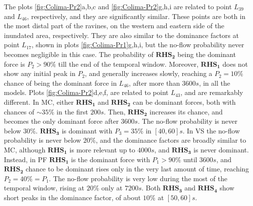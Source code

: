 \documentclass{article}
\begin{document}
The plots \ref{fig:Colima-Pr2}a,b,c and \ref{fig:Colima-Pr2}g,h,i are related to point $L_{39}$ and $L_{46}$, respectively, and they are significantly similar. These points are both in the most distal part of the ravines, on the western and eastern side of the inundated area, respectively. They are also similar to the dominance factors at point $L_{17}$, shown in plots \ref{fig:Colima-Pr1}g,h,i, but the no-flow probability never becomes negligible in this case. The probability of $\boldsymbol{RHS_2}$ being the dominant force is $P_2>90\%$ till the end of the temporal window. Moreover, $\boldsymbol{RHS_1}$ does not show any initial peak in $P_2$, and generally increases slowly, reaching a $P_2=10\%$ chance of being the dominant force in $L_{46}$, after more than $3600 s$, in all the models. Plots \ref{fig:Colima-Pr2}d,e,f, are related to point $L_{43}$, and are remarkably different. In MC, either $\boldsymbol{RHS_1}$ and $\boldsymbol{RHS_2}$ can be dominant forces, both with chances of $\sim 35\%$ in the first $200 s$. Then, $\boldsymbol{RHS_2}$ increases its chance, and becomes the only dominant force after $3600 s$. The no-flow probability is never below $30\%$. $\boldsymbol{RHS_3}$ is dominant with $P_3=35\%$ in $[40, 60] s$. In VS the no-flow probability is never below $20\%$, and the dominance factors are broadly similar to MC, although $\boldsymbol{RHS_1}$ is more relevant up to $4000 s$, and $\boldsymbol{RHS_3}$ is never dominant. Instead, in PF $\boldsymbol{RHS_1}$ is the dominant force with $P_1>90\%$ until $3600 s$, and $\boldsymbol{RHS_2}$ chance to be dominant rises only in the very last amount of time, reaching $P_2=40\%=P_1$. The no-flow probability is very low during the most of the temporal window, rising at $20\%$ only at $7200 s$. Both $\boldsymbol{RHS_3}$ and $\boldsymbol{RHS_4}$ show short peaks in the dominance factor, of about $10\%$ at $[50,60] s$.
\end{document}
